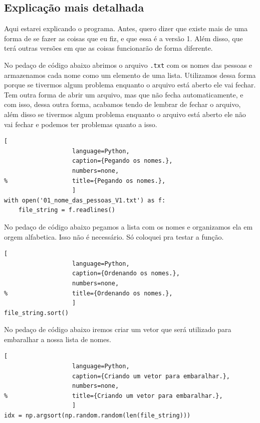 \newpage

\subsection{Explicação mais detalhada}

Aqui estarei explicando o programa.
Antes, quero dizer que existe mais de uma forma de se fazer as coisas que eu fiz, e que essa é a versão 1.
Além disso, que terá outras versões em que as coisas funcionarão de forma diferente.

No pedaço de código abaixo abrimos o arquivo \texttt{.txt} com os nomes das pessoas e armazenamos cada nome como um elemento de uma lista.
Utilizamos dessa forma porque se tivermos algum problema enquanto o arquivo está aberto ele vai fechar.
Tem outra forma de abrir um arquivo, mas que não fecha automaticamente, e com isso, dessa outra forma, acabamos tendo de lembrar de fechar o arquivo, além disso se tivermos algum problema enquanto o arquivo está aberto ele não vai fechar e podemos ter problemas quanto a isso.

\begin{lstlisting}[
				   language=Python,
				   caption={Pegando os nomes.},
				   numbers=none,
%				   title={Pegando os nomes.},
				   ]
with open('01_nome_das_pessoas_V1.txt') as f:
    file_string = f.readlines()
\end{lstlisting}

No pedaço de código abaixo pegamos a lista com os nomes e organizamos ela em orgem alfabetica.
Isso não é necessário.
Só coloquei pra testar a função.

\begin{lstlisting}[
				   language=Python,
				   caption={Ordenando os nomes.},
				   numbers=none,
%				   title={Ordenando os nomes.},
				   ]
file_string.sort()
\end{lstlisting}

No pedaço de código abaixo iremos criar um vetor que será utilizado para embaralhar a nossa lista de nomes.

\begin{lstlisting}[
				   language=Python,
				   caption={Criando um vetor para embaralhar.},
				   numbers=none,
%				   title={Criando um vetor para embaralhar.},
				   ]
idx = np.argsort(np.random.random(len(file_string)))
\end{lstlisting}

